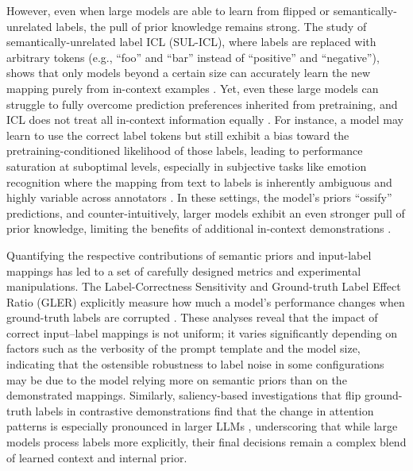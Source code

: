 \documentclass[11pt]{article}
\begin{document}
However, even when large models are able to learn from flipped or semantically-unrelated labels, the pull of prior knowledge remains strong. The study of semantically-unrelated label ICL (SUL-ICL), where labels are replaced with arbitrary tokens (e.g., ``foo'' and ``bar'' instead of ``positive'' and ``negative''), shows that only models beyond a certain size can accurately learn the new mapping purely from in-context examples \cite{ref40}. Yet, even these large models can struggle to fully overcome prediction preferences inherited from pretraining, and ICL does not treat all in-context information equally \cite{ref41}. For instance, a model may learn to use the correct label tokens but still exhibit a bias toward the pretraining-conditioned likelihood of those labels, leading to performance saturation at suboptimal levels, especially in subjective tasks like emotion recognition where the mapping from text to labels is inherently ambiguous and highly variable across annotators \cite{ref42}. In these settings, the model's priors ``ossify'' predictions, and counter-intuitively, larger models exhibit an even stronger pull of prior knowledge, limiting the benefits of additional in-context demonstrations \cite{ref42}.

Quantifying the respective contributions of semantic priors and input-label mappings has led to a set of carefully designed metrics and experimental manipulations. The Label-Correctness Sensitivity and Ground-truth Label Effect Ratio (GLER) explicitly measure how much a model's performance changes when ground-truth labels are corrupted \cite{ref43}. These analyses reveal that the impact of correct input--label mappings is not uniform; it varies significantly depending on factors such as the verbosity of the prompt template and the model size, indicating that the ostensible robustness to label noise in some configurations may be due to the model relying more on semantic priors than on the demonstrated mappings. Similarly, saliency-based investigations that flip ground-truth labels in contrastive demonstrations find that the change in attention patterns is especially pronounced in larger LLMs \cite{ref44}, underscoring that while large models process labels more explicitly, their final decisions remain a complex blend of learned context and internal prior.
\end{document}
